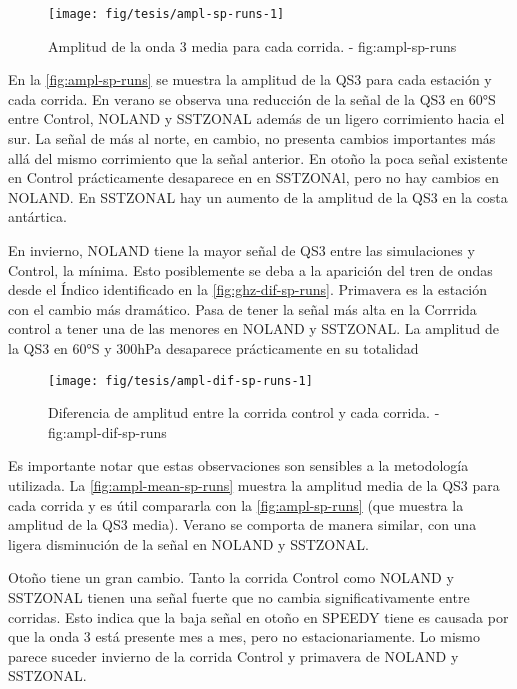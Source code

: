 \documentclass[spanish,a4paper]{book}
\begin{document}
\begin{figure*}
\texttt{[image: fig/tesis/ampl-sp-runs-1]} \caption{Amplitud de la onda 3 media para cada corrida. - fig:ampl-sp-runs}\label{fig:ampl-sp-runs}
\end{figure*}

En la \autoref{fig:ampl-sp-runs} se muestra la amplitud de la QS3 para
cada estación y cada corrida. En verano se observa una reducción de la
señal de la QS3 en 60°S entre Control, NOLAND y SSTZONAL además de un
ligero corrimiento hacia el sur. La señal de más al norte, en cambio, no
presenta cambios importantes más allá del mismo corrimiento que la señal
anterior. En otoño la poca señal existente en Control prácticamente
desaparece en en SSTZONAl, pero no hay cambios en NOLAND. En SSTZONAL
hay un aumento de la amplitud de la QS3 en la costa antártica.

En invierno, NOLAND tiene la mayor señal de QS3 entre las simulaciones y
Control, la mínima. Esto posiblemente se deba a la aparición del tren de
ondas desde el Índico identificado en la \autoref{fig:ghz-dif-sp-runs}.
Primavera es la estación con el cambio más dramático. Pasa de tener la
señal más alta en la Corrrida control a tener una de las menores en
NOLAND y SSTZONAL. La amplitud de la QS3 en 60°S y 300hPa desaparece
prácticamente en su totalidad


\begin{figure*}
\texttt{[image: fig/tesis/ampl-dif-sp-runs-1]} \caption{Diferencia de amplitud entre la corrida control y cada corrida. - fig:ampl-dif-sp-runs}\label{fig:ampl-dif-sp-runs}
\end{figure*}

Es importante notar que estas observaciones son sensibles a la
metodología utilizada. La \autoref{fig:ampl-mean-sp-runs} muestra la
amplitud media de la QS3 para cada corrida y es útil compararla con la
\autoref{fig:ampl-sp-runs} (que muestra la amplitud de la QS3 media).
Verano se comporta de manera similar, con una ligera disminución de la
señal en NOLAND y SSTZONAL.

Otoño tiene un gran cambio. Tanto la corrida Control como NOLAND y
SSTZONAL tienen una señal fuerte que no cambia significativamente entre
corridas. Esto indica que la baja señal en otoño en SPEEDY tiene es
causada por que la onda 3 está presente mes a mes, pero no
estacionariamente. Lo mismo parece suceder invierno de la corrida
Control y primavera de NOLAND y SSTZONAL.
\end{document}
